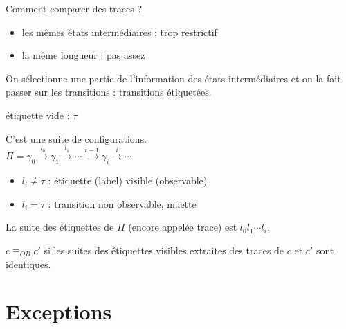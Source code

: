 \documentclass[10pt,a4paper]{article}
\begin{document}
Comment comparer des traces ? \begin{itemize}
\item les mêmes états intermédiaires : trop restrictif
\item la même longueur : pas assez
\end{itemize}
On sélectionne une partie de l'information des états intermédiaires et on la fait passer sur les transitions : transitions étiquetées.

étiquette vide : $\tau$

\begin{definition}
C'est une suite de configurations.\\
$\Pi = \gamma_0 \xrightarrow{l_0} \gamma_1 \xrightarrow{l_1} \cdots \xrightarrow{i-1} \gamma_i \xrightarrow{i} \cdots$
\begin{itemize}
\item $l_i \not = \tau $ : étiquette (label) visible (observable)
\item $l_i = \tau$ : transition non observable, muette
\end{itemize}
La suite des étiquettes de $\Pi$ (encore appelée trace) est $l_0l_1\cdots l_i$.
\end{definition}

\begin{definition}
$c \equiv_{OB} c'$ si les suites des étiquettes visibles extraites des traces de $c$ et $c'$ sont identiques.
\end{definition}

\section{Exceptions}
\end{document}
